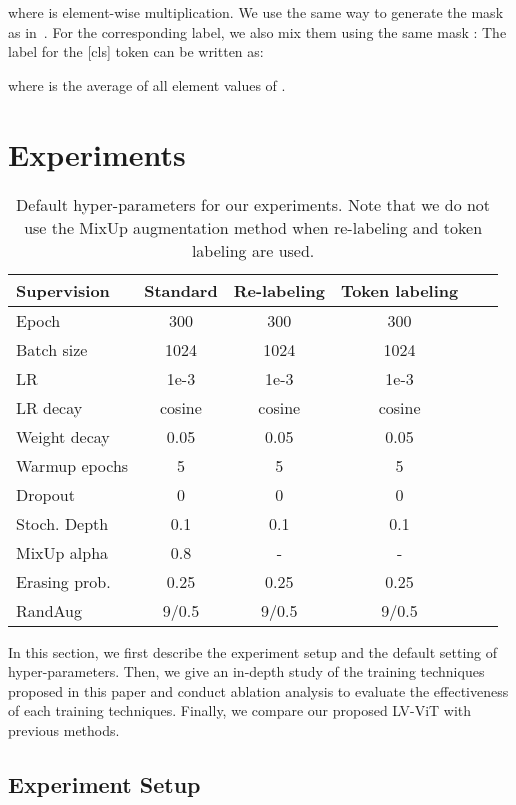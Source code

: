 \documentclass[10pt,twocolumn,letterpaper]{article}
\newcommand{\nameofmethod}{LV-ViT}
\begin{document}
where  is element-wise multiplication. We use the same way to generate the mask 
as in~\cite{yun2019cutmix}.
For the corresponding label, we also mix them using the same mask : 
The label for the [cls] token can be written as:

where  is the average of all element values of .



\section{Experiments}

\begin{table}[t]
  \centering
  \small
  \setlength\tabcolsep{1.2mm}
  \renewcommand\arraystretch{1}
  \caption{Default hyper-parameters for our experiments. Note that we do not use the MixUp augmentation method
  when re-labeling and token labeling are used.}
  \label{tab:hyper_p}
  \begin{tabular}{lccccc} \toprule[0.5pt]
    Supervision & Standard & Re-labeling & Token labeling \\ \midrule[0.5pt] \midrule[0.5pt]
    Epoch & 300 & 300 & 300\\ \midrule[0.5pt]
    Batch size & 1024 & 1024 & 1024\\
    LR & 1e-3  &  1e-3  &  1e-3 \\
    LR decay & cosine & cosine & cosine\\
    Weight decay & 0.05& 0.05& 0.05\\
    Warmup epochs& 5 & 5 & 5 \\\midrule[0.5pt]
    Dropout & 0 & 0& 0\\
    Stoch. Depth & 0.1 & 0.1 & 0.1 \\
    MixUp alpha & 0.8 & - & -\\
Erasing prob. & 0.25 & 0.25 &0.25\\
    RandAug & 9/0.5 & 9/0.5 & 9/0.5\\
    \bottomrule[0.5pt]
  \end{tabular}
\end{table}

In this section, we first describe the experiment setup and the default setting of hyper-parameters.
Then, we give an in-depth study of the training techniques proposed in this paper and 
conduct ablation analysis to evaluate the effectiveness of each training techniques.
Finally, we compare our proposed \nameofmethod{} with previous methods.

\subsection{Experiment Setup}
\end{document}
